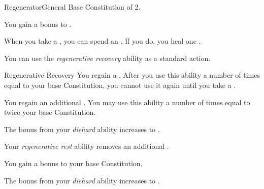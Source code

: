     \begin{feat}{Regenerator}{General}
        \featpre Base Constitution of 2.

         You gain a  bonus to .

         When you take a , you can spend an . If you do, you heal one .

         You can use the \textit{regenerative recovery} ability as a standard action.
        \begin{freeability}{Regenerative Recovery}
            You regain a .
            After you use this ability a number of times equal to your base Constitution, you cannot use it again until you take a .

            \rankline
             You regain an additional .
             You may use this ability a number of times equal to twice your base Constitution.
        \end{freeability}

         The bonus from your \textit{diehard} ability increases to .

         Your \textit{regenerative rest} ability removes an additional .

         You gain a  bonus to your base Constitution.

         The bonus from your \textit{diehard} ability increases to .
    \end{feat}


